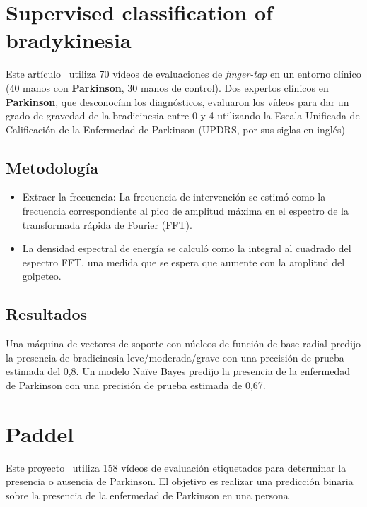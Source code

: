 \section{Supervised classification of bradykinesia}
Este artículo~\cite{williams2020supervised} utiliza 70 vídeos de evaluaciones de \textit{finger-tap} en un entorno clínico (40 manos con \textbf{Parkinson}, 30 manos de control).
Dos expertos clínicos en \textbf{Parkinson}, que desconocían los diagnósticos, evaluaron los vídeos para dar un grado de gravedad de la bradicinesia entre 0 y 4 utilizando la Escala Unificada de Calificación de la Enfermedad de Parkinson (UPDRS, por sus siglas en inglés)


\subsection{Metodología}
\begin{itemize}
	\item Extraer la frecuencia: La frecuencia de intervención se estimó como la frecuencia correspondiente al pico de amplitud máxima en el espectro de la transformada rápida de Fourier (FFT). 
	\item La densidad espectral de energía se calculó como la integral al cuadrado del espectro FFT, una medida que se espera que aumente con la amplitud del golpeteo.
\end{itemize}
\subsection{Resultados}
Una máquina de vectores de soporte con núcleos de función de base radial predijo la presencia de bradicinesia leve/moderada/grave con una precisión de prueba estimada del 0,8.
Un modelo Naïve Bayes predijo la presencia de la enfermedad de Parkinson con una precisión de prueba estimada de 0,67. 

\section{Paddel}

Este proyecto~\cite{paddelRepo} utiliza 158 vídeos de evaluación etiquetados para determinar la presencia o ausencia de Parkinson. El objetivo es realizar una predicción binaria sobre la presencia de la enfermedad de Parkinson en una persona

